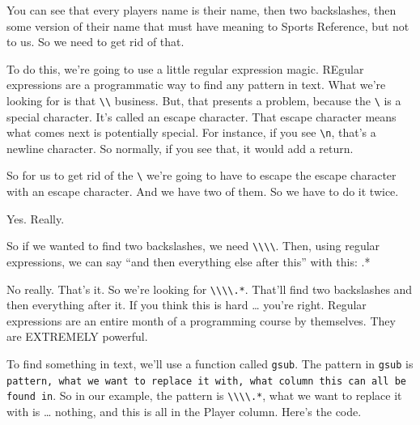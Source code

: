 \documentclass[
]{book}
\newenvironment{Shaded}{\begin{snugshade}}{\end{snugshade}}
\newcommand{\CharTok}[1]{\textcolor[rgb]{0.31,0.60,0.02}{#1}}
\newcommand{\DataTypeTok}[1]{\textcolor[rgb]{0.13,0.29,0.53}{#1}}
\newcommand{\KeywordTok}[1]{\textcolor[rgb]{0.13,0.29,0.53}{\textbf{#1}}}
\newcommand{\NormalTok}[1]{#1}
\newcommand{\OperatorTok}[1]{\textcolor[rgb]{0.81,0.36,0.00}{\textbf{#1}}}
\newcommand{\StringTok}[1]{\textcolor[rgb]{0.31,0.60,0.02}{#1}}
\begin{document}
You can see that every players name is their name, then two backslashes, then some version of their name that must have meaning to Sports Reference, but not to us. So we need to get rid of that.

To do this, we're going to use a little regular expression magic. REgular expressions are a programmatic way to find any pattern in text. What we're looking for is that \texttt{\textbackslash{}\textbackslash{}} business. But, that presents a problem, because the \texttt{\textbackslash{}} is a special character. It's called an escape character. That escape character means what comes next is potentially special. For instance, if you see \texttt{\textbackslash{}n}, that's a newline character. So normally, if you see that, it would add a return.

So for us to get rid of the \texttt{\textbackslash{}} we're going to have to escape the escape character with an escape character. And we have two of them. So we have to do it twice.

Yes. Really.

So if we wanted to find two backslashes, we need \texttt{\textbackslash{}\textbackslash{}\textbackslash{}\textbackslash{}}. Then, using regular expressions, we can say ``and then everything else after this'' with this: .*

No really. That's it. So we're looking for \texttt{\textbackslash{}\textbackslash{}\textbackslash{}\textbackslash{}.*}. That'll find two backslashes and then everything after it. If you think this is hard \ldots{} you're right. Regular expressions are an entire month of a programming course by themselves. They are EXTREMELY powerful.

To find something in text, we'll use a function called \texttt{gsub}. The pattern in \texttt{gsub} is \texttt{pattern,\ what\ we\ want\ to\ replace\ it\ with,\ what\ column\ this\ can\ all\ be\ found\ in}. So in our example, the pattern is \texttt{\textbackslash{}\textbackslash{}\textbackslash{}\textbackslash{}.*}, what we want to replace it with is \ldots{} nothing, and this is all in the Player column. Here's the code.

\begin{Shaded}
\end{Shaded}
\end{document}
